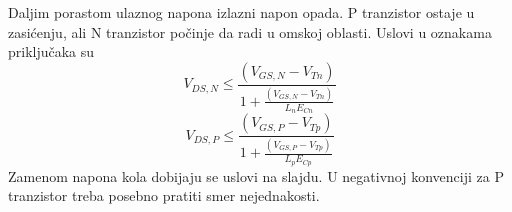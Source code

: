 Daljim porastom ulaznog napona izlazni napon opada. P tranzistor ostaje u zasićenju, ali N tranzistor počinje da radi u omskoj oblasti. Uslovi u oznakama priključaka su
\[V_{DS,N} \le \frac{(V_{GS,N}-V_{Tn})}{1+\frac{(V_{GS,N}-V_{Tn})}{L_nE_{Cn}}}\]
\[V_{DS,P} \le \frac{(V_{GS,P}-V_{Tp})}{1+\frac{(V_{GS,P}-V_{Tp})}{L_pE_{Cp}}}\]
Zamenom napona kola dobijaju se uslovi na slajdu. U negativnoj konvenciji za P tranzistor treba posebno pratiti smer nejednakosti.
